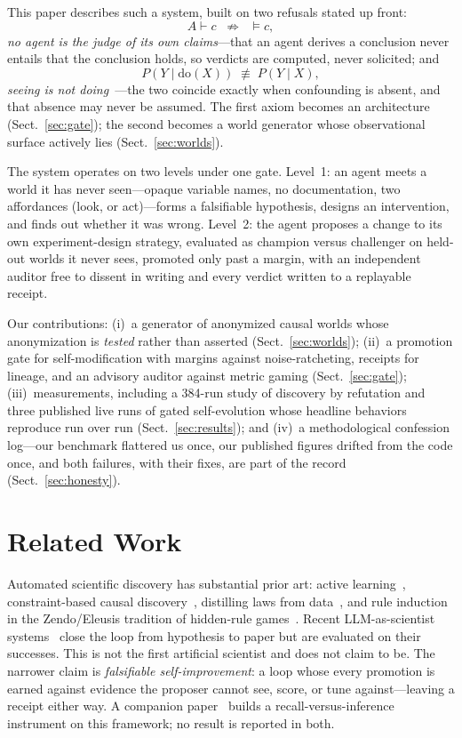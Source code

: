 \documentclass{llncs}
\begin{document}
This paper describes such a system, built on two refusals stated up front:
\begin{equation}
A \vdash c \;\;\not\Rightarrow\;\; \vDash c ,
\end{equation}
\emph{no agent is the judge of its own claims}---that an agent derives a
conclusion never entails that the conclusion holds, so verdicts are computed,
never solicited; and
\begin{equation}
P(Y \mid \mathrm{do}(X)) \;\not\equiv\; P(Y \mid X) ,
\end{equation}
\emph{seeing is not doing}~\cite{pearl}---the two coincide exactly when
confounding is absent, and that absence may never be assumed. The first axiom
becomes an architecture (Sect.~\ref{sec:gate}); the second becomes a world
generator whose observational surface actively lies (Sect.~\ref{sec:worlds}).

The system operates on two levels under one gate. Level~1: an agent meets a
world it has never seen---opaque variable names, no documentation, two
affordances (look, or act)---forms a falsifiable hypothesis, designs an
intervention, and finds out whether it was wrong. Level~2: the agent proposes
a change to its own experiment-design strategy, evaluated as champion versus
challenger on held-out worlds it never sees, promoted only past a margin, with
an independent auditor free to dissent in writing and every verdict written to
a replayable receipt.

Our contributions: (i)~a generator of anonymized causal worlds whose
anonymization is \emph{tested} rather than asserted
(Sect.~\ref{sec:worlds}); (ii)~a promotion gate for self-modification with
margins against noise-ratcheting, receipts for lineage, and an advisory
auditor against metric gaming (Sect.~\ref{sec:gate}); (iii)~measurements,
including a 384-run study of discovery by refutation and three published live
runs of gated self-evolution whose headline behaviors reproduce run over run
(Sect.~\ref{sec:results}); and (iv)~a methodological confession log---our
benchmark flattered us once, our published figures drifted from the code once,
and both failures, with their fixes, are part of the record
(Sect.~\ref{sec:honesty}).

\section{Related Work}

Automated scientific discovery has substantial prior art: active
learning~\cite{settles}, constraint-based causal discovery~\cite{spirtes},
distilling laws from data~\cite{schmidt}, and rule induction in the
Zendo/Eleusis tradition of hidden-rule games~\cite{gardner}. Recent
LLM-as-scientist systems~\cite{aiscientist} close the loop from hypothesis to
paper but are evaluated on their successes. This is not the first artificial
scientist and does not claim to be. The narrower claim is \emph{falsifiable
self-improvement}: a loop whose every promotion is earned against evidence the
proposer cannot see, score, or tune against---leaving a receipt either way. A
companion paper~\cite{companion} builds a recall-versus-inference instrument
on this framework; no result is reported in both.
\end{document}
